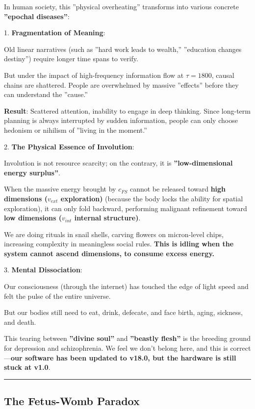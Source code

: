 In human society, this ''physical overheating'' transforms into various concrete \textbf{''epochal diseases''}:

1.  \textbf{Fragmentation of Meaning}:

    Old linear narratives (such as ''hard work leads to wealth,'' ''education changes destiny'') require longer time spans to verify.

    But under the impact of high-frequency information flow at $\tau=1800$, causal chains are shattered. People are overwhelmed by massive ''effects'' before they can understand the ''cause.''

    \textbf{Result}: Scattered attention, inability to engage in deep thinking. Since long-term planning is always interrupted by sudden information, people can only choose hedonism or nihilism of ''living in the moment.''

2.  \textbf{The Physical Essence of Involution}:

    Involution is not resource scarcity; on the contrary, it is \textbf{''low-dimensional energy surplus''}.

    When the massive energy brought by $c_{FS}$ cannot be released toward \textbf{high dimensions ($v_{ext}$ exploration)} (because the body locks the ability for spatial exploration), it can only fold backward, performing malignant refinement toward \textbf{low dimensions ($v_{int}$ internal structure)}.

    We are doing rituals in snail shells, carving flowers on micron-level chips, increasing complexity in meaningless social rules. \textbf{This is idling when the system cannot ascend dimensions, to consume excess energy.}

3.  \textbf{Mental Dissociation}:

    Our consciousness (through the internet) has touched the edge of light speed and felt the pulse of the entire universe.

    But our bodies still need to eat, drink, defecate, and face birth, aging, sickness, and death.

    This tearing between \textbf{''divine soul''} and \textbf{''beastly flesh''} is the breeding ground for depression and schizophrenia. We feel we don't belong here, and this is correct---\textbf{our software has been updated to v18.0, but the hardware is still stuck at v1.0}.

\hrule

\subsection{The Fetus-Womb Paradox}

